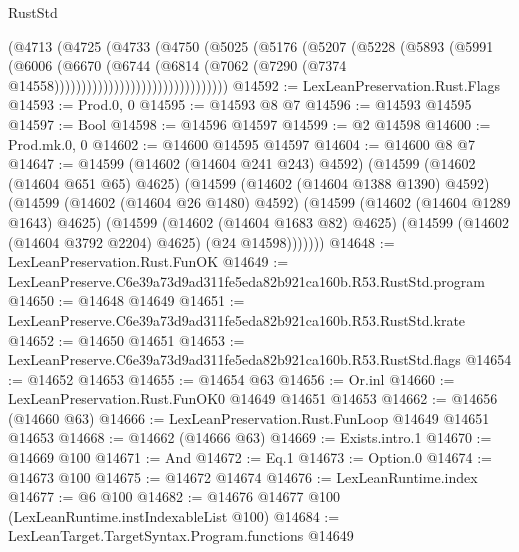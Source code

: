\begin{lexlean}{RustStd}
\begin{coremodule}
                                  (@4713
                                    (@4725
                                      (@4733
                                        (@4750
                                          (@5025
                                            (@5176
                                              (@5207
                                                (@5228
                                                  (@5893
                                                    (@5991
                                                      (@6006
                                                        (@6670
                                                          (@6744
                                                            (@6814
                                                              (@7062
                                                                (@7290
                                                                  (@7374
                                                                    @14558))))))))))))))))))))))))))))))))
@14592 := LexLeanPreservation.Rust.Flags
@14593 := Prod.{0, 0}
@14595 := @14593 @8 @7
@14596 := @14593 @14595
@14597 := Bool
@14598 := @14596 @14597
@14599 := @2 @14598
@14600 := Prod.mk.{0, 0}
@14602 := @14600 @14595 @14597
@14604 := @14600 @8 @7
@14647 := @14599
    (@14602 (@14604 @241 @243) @4592)
    (@14599
      (@14602 (@14604 @651 @65) @4625)
      (@14599
        (@14602 (@14604 @1388 @1390) @4592)
        (@14599
          (@14602 (@14604 @26 @1480) @4592)
          (@14599
            (@14602 (@14604 @1289 @1643) @4625)
            (@14599
              (@14602 (@14604 @1683 @82) @4625)
              (@14599 (@14602 (@14604 @3792 @2204) @4625) (@24 @14598)))))))
@14648 := LexLeanPreservation.Rust.FunOK
@14649 := LexLeanPreserve.C6e39a73d9ad311fe5eda82b921ca160b.R53.RustStd.program
@14650 := @14648 @14649
@14651 := LexLeanPreserve.C6e39a73d9ad311fe5eda82b921ca160b.R53.RustStd.krate
@14652 := @14650 @14651
@14653 := LexLeanPreserve.C6e39a73d9ad311fe5eda82b921ca160b.R53.RustStd.flags
@14654 := @14652 @14653
@14655 := @14654 @63
@14656 := Or.inl
@14660 := LexLeanPreservation.Rust.FunOK0 @14649 @14651 @14653
@14662 := @14656 (@14660 @63)
@14666 := LexLeanPreservation.Rust.FunLoop @14649 @14651 @14653
@14668 := @14662 (@14666 @63)
@14669 := Exists.intro.{1}
@14670 := @14669 @100
@14671 := And
@14672 := Eq.{1}
@14673 := Option.{0}
@14674 := @14673 @100
@14675 := @14672 @14674
@14676 := LexLeanRuntime.index
@14677 := @6 @100
@14682 := @14676 @14677 @100 (LexLeanRuntime.instIndexableList @100)
@14684 := LexLeanTarget.TargetSyntax.Program.functions @14649

\end{coremodule}
\end{lexlean}
